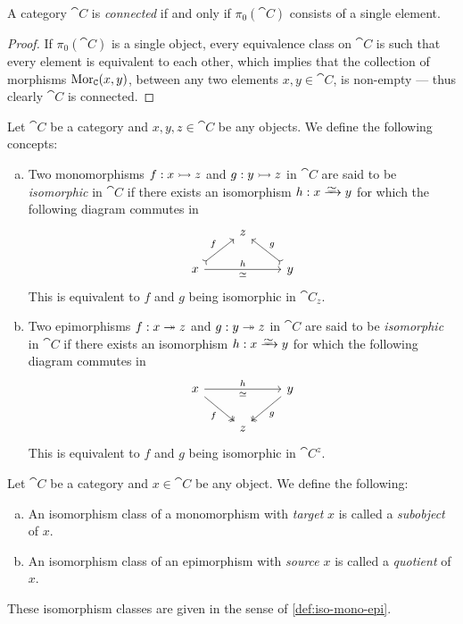 \begin{corollary}
\label{cor:connected-iff-class-point}
A category \(\cat C\) is \emph{connected} if and only if \(\pi_0(\cat C)\)
consists of a single element.
\end{corollary}

\begin{proof}
If \(\pi_0(\cat C)\) is a single object, every equivalence class on \(\cat C\)
is such that every element is equivalent to each other, which implies that the
collection of morphisms \(\operatorname{Mor}_{\texttt C}(x, y)\), between any two elements \(x, y
\in \cat C\), is non-empty --- thus clearly \(\cat C\) is connected.
\end{proof}

\begin{definition}
\label{def:iso-mono-epi}
Let \(\cat C\) be a category and \(x, y, z \in \cat C\) be any objects. We
define the following concepts:
\begin{enumerate}[(a)]\setlength\itemsep{0em}
\item Two monomorphisms \(f: x \rightarrowtail z\) and \(g: y \rightarrowtail z\) in \(\cat C\) are
  said to be \emph{isomorphic} in \(\cat C\) if there exists an isomorphism \(h:
  x \isoto y\) for which the following diagram commutes in
  \[
    \begin{tikzcd}
      &z & \\
      x \ar[rr, "h", "\iso"'] \ar[ur, tail, "f"] &
      &y \ar[ul, tail, swap, "g"]
    \end{tikzcd}
  \]
  This is equivalent to \(f\) and \(g\) being isomorphic in \(\cat C_z\).
\item Two epimorphisms \(f: x \twoheadrightarrow z\) and \(g: y \twoheadrightarrow z\) in \(\cat C\) are
  said to be \emph{isomorphic} in \(\cat C\) if there exists an isomorphism \(h:
  x \isoto y\) for which the following diagram commutes in
  \[
    \begin{tikzcd}
      x \ar[rr, "h", "\iso"'] \ar[dr, two heads, swap, "f"] &
      &y \ar[dl, two heads, "g"] \\
      &z &
    \end{tikzcd}
  \]
  This is equivalent to \(f\) and \(g\) being isomorphic in \(\cat C^z\).
\end{enumerate}
\end{definition}

\begin{definition}
\label{def:subobject-quotient}
Let \(\cat C\) be a category and \(x \in \cat C\) be any object. We define the
following:
\begin{enumerate}[(a)]\setlength\itemsep{0em}
\item An isomorphism class of a monomorphism with \emph{target} \(x\) is called a
  \emph{subobject} of \(x\).
\item An isomorphism class of an epimorphism with \emph{source} \(x\) is called a
  \emph{quotient} of \(x\).
\end{enumerate}
These isomorphism classes are given in the sense of \cref{def:iso-mono-epi}.
\end{definition}

